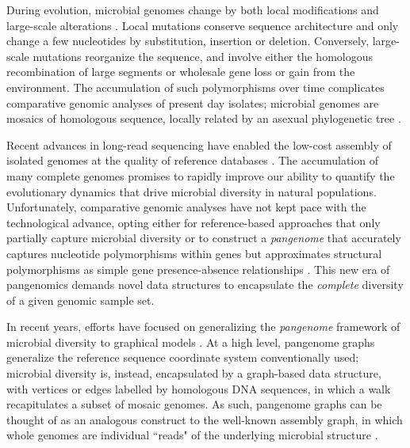 \documentclass[aps,rmp,reprint,superscriptaddress,notitlepage,10pt]{revtex4-1}
\begin{document}
During evolution, microbial genomes change by both local modifications and large-scale alterations \cite{arnold2021horizontal}.
Local mutations conserve sequence architecture and only change a few nucleotides by substitution, insertion or deletion.
Conversely, large-scale mutations reorganize the sequence, and involve either the homologous recombination of large segments or wholesale gene loss or gain from the environment.
The accumulation of such polymorphisms over time complicates comparative genomic analyses of present day isolates; microbial genomes are mosaics of homologous sequence, locally related by an asexual phylogenetic tree \cite{sakoparnig2021whole}.

Recent advances in long-read sequencing have enabled the low-cost assembly of isolated genomes at the quality of reference databases \cite{whibley2021changing}.
The accumulation of many complete genomes promises to rapidly improve our ability to quantify the evolutionary dynamics that drive microbial diversity in natural populations.
Unfortunately, comparative genomic analyses have not kept pace with the technological advance, opting either for reference-based approaches that only partially capture microbial diversity \cite{tettelin2008comparative}  or to construct a \emph{pangenome} that accurately captures nucleotide polymorphisms within genes but approximates structural polymorphisms as simple gene presence-absence relationships \cite{page2015roary,ding2018panx} .
This new era of pangenomics demands novel data structures to encapsulate the \emph{complete} diversity of a given genomic sample set.

In recent years, efforts have focused on generalizing the \emph{pangenome} framework of microbial diversity to graphical models \cite{eizenga2020pangenome}.
At a high level, pangenome graphs generalize the reference sequence coordinate system conventionally used; microbial diversity is, instead, encapsulated by a graph-based data structure, with vertices or edges labelled by homologous DNA sequences, in which a walk recapitulates a subset of mosaic genomes.
As such, pangenome graphs can be thought of as an analogous construct to the well-known assembly graph, in which whole genomes are individual ``reads" of the underlying microbial structure \cite{myers2005fragment}.
\end{document}
